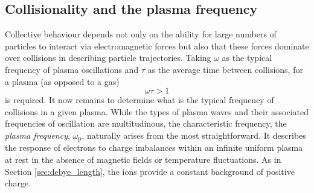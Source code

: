 \subsection{\label{sec:plasma_frequency}Collisionality and the plasma frequency}
Collective behaviour depends not only on the ability for large numbers of particles to interact via electromagnetic forces but also that these forces dominate over collisions in describing particle trajectories. Taking $\omega$ as the typical frequency of plasma oscillations and $\tau$ as the average time between collisions, for a plasma (as opposed to a gas)
\begin{equation}\label{eq:plasma_frequency_condition}
	\omega\tau > 1
\end{equation}
is required. It now remains to determine what is the typical frequency of collisions in a given plasma. While the types of plasma waves and their associated frequencies of oscillation are multitudinous, the characteristic frequency, the \textit{plasma frequency}, $\omega_\mathrm{p}$, naturally arises from the most straightforward. It describes the response of electrons to charge imbalances within an infinite uniform plasma at rest in the absence of magnetic fields or temperature fluctuations. As in Section \ref{sec:debye_length}, the ions provide a constant background of positive charge.

